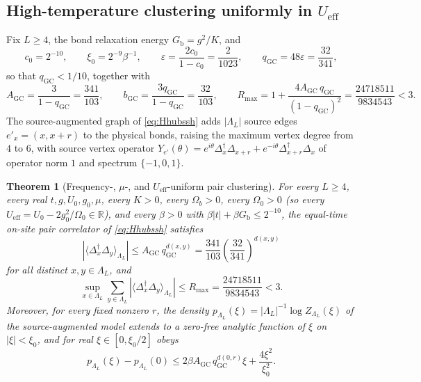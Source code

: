 \documentclass[11pt]{article}
\newtheorem{theorem}{Theorem}[section]
\theoremstyle{definition}
\theoremstyle{remark}
\newcommand{\R}{\mathbb{R}}
\newcommand{\eff}{\mathrm{eff}}
\newcommand{\Gb}{G_{\mathrm{b}}}
\newcommand{\Ueff}{U_{\eff}}
\begin{document}
\subsection{High-temperature clustering uniformly in \texorpdfstring{$\Ueff$}{U\_eff}}

Fix $L\ge4$, the bond relaxation energy $\Gb=g^2/K$, and
\begin{equation}
c_0=2^{-10},\qquad \xi_0=2^{-9}\beta^{-1},\qquad
\varepsilon=\frac{2c_0}{1-c_0}=\frac{2}{1023},\qquad
q_{\mathrm{GC}}=48\varepsilon=\frac{32}{341},
\label{eq:constants}
\end{equation}
so that $q_{\mathrm{GC}}<1/10$, together with
\begin{equation}
A_{\mathrm{GC}}=\frac{3}{1-q_{\mathrm{GC}}}=\frac{341}{103},\qquad
b_{\mathrm{GC}}=\frac{3q_{\mathrm{GC}}}{1-q_{\mathrm{GC}}}=\frac{32}{103},\qquad
R_{\max}=1+\frac{4A_{\mathrm{GC}}\,q_{\mathrm{GC}}}{(1-q_{\mathrm{GC}})^2}
=\frac{24718511}{9834543}<3 .
\label{eq:constants2}
\end{equation}
The source-augmented graph of \eqref{eq:Hhubssh} adds $|\Lambda_L|$ source edges
$e'_x=(x,x+r)$ to the physical bonds, raising the maximum vertex degree from $4$ to
$6$, with source vertex operator
$Y_{e'}(\theta)=e^{i\theta}\Delta_x^\dagger\Delta_{x+r}+e^{-i\theta}
\Delta_{x+r}^\dagger\Delta_x$ of operator norm $1$ and spectrum $\{-1,0,1\}$.

\begin{theorem}[Frequency-, $\mu$-, and $\Ueff$-uniform pair clustering]
\label{thm:gc}
For every $L\ge4$, every real $t,g,U_0,g_0,\mu$, every $K>0$, every $\Omega_b>0$,
every $\Omega_0>0$ (so every $\Ueff=U_0-2g_0^2/\Omega_0\in\R$), and every $\beta>0$
with $\beta|t|+\beta\Gb\le2^{-10}$, the equal-time on-site pair correlator of
\eqref{eq:Hhubssh} satisfies
\begin{equation}
\left|\langle\Delta_x^\dagger\Delta_y\rangle_{\Lambda_L}\right|
\le A_{\mathrm{GC}}\,q_{\mathrm{GC}}^{d(x,y)}
=\frac{341}{103}\left(\frac{32}{341}\right)^{d(x,y)}
\label{eq:gcb}
\end{equation}
for all distinct $x,y\in\Lambda_L$, and
\begin{equation}
\sup_{x\in\Lambda_L}\sum_{y\in\Lambda_L}
\left|\langle\Delta_x^\dagger\Delta_y\rangle_{\Lambda_L}\right|
\le R_{\max}=\frac{24718511}{9834543}<3 .
\label{eq:rmax}
\end{equation}
Moreover, for every fixed nonzero $r$, the density
$p_{\Lambda_L}(\xi)=|\Lambda_L|^{-1}\log Z_{\Lambda_L}(\xi)$ of the
source-augmented model extends to a zero-free analytic function of $\xi$ on
$|\xi|<\xi_0$, and for real $\xi\in[0,\xi_0/2]$ obeys
\begin{equation}
p_{\Lambda_L}(\xi)-p_{\Lambda_L}(0)\le
2\beta A_{\mathrm{GC}}\,q_{\mathrm{GC}}^{d(0,r)}\xi+\frac{4\xi^2}{\xi_0^2}.
\label{eq:source}
\end{equation}
\end{theorem}
\end{document}

